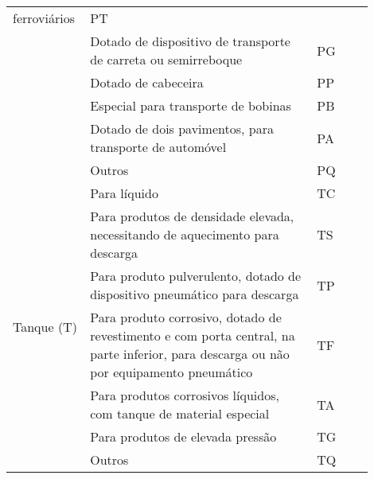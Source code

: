 \begin{longtable}{p{0.15\linewidth}p{0.6\linewidth}p{0.15\linewidth}}
                                            ferroviários                                                & PT \\
                                            & Dotado de dispositivo de transporte de carreta ou
                                            semirreboque                                                & PG \\
                                            & Dotado de cabeceira                                       & PP \\
                                            & Especial para transporte de bobinas                       & PB \\
                                            & Dotado de dois pavimentos, para transporte de automóvel   & PA \\
                                            & Outros                                                    & PQ \\ \midrule
          \multirow{7}{2.5cm}{Tanque (T)}   & Para líquido                                              & TC \\
                                            & Para produtos de densidade elevada, necessitando de 
                                            aquecimento para descarga                                   & TS \\
                                            & Para produto pulverulento, dotado de dispositivo pneumático
                                            para descarga                                               & TP \\
                                            & Para produto corrosivo, dotado de revestimento e com porta
                                            central, na parte inferior, para descarga ou não por
                                            equipamento pneumático                                      & TF \\
                                            & Para produtos corrosivos líquidos, com tanque de material
                                            especial                                                    & TA \\
                                            & Para produtos de elevada pressão                          & TG \\
                                            & Outros                                                    & TQ \\
         \bottomrule
    \end{longtable}
